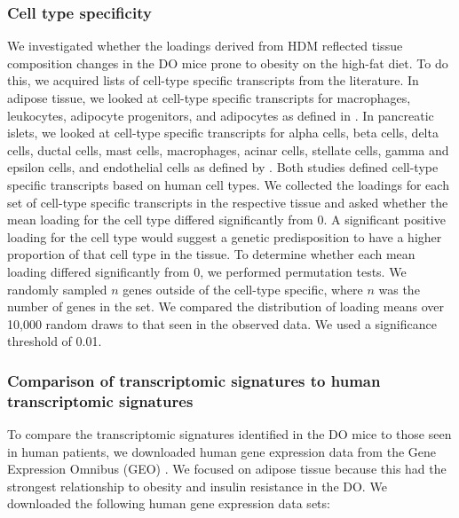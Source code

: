 \documentclass[
]{article}
\begin{document}
\subsubsection{Cell type specificity}\label{cell-type-specificity}

We investigated whether the loadings derived from HDM reflected tissue
composition changes in the DO mice prone to obesity on the high-fat
diet. To do this, we acquired lists of cell-type specific transcripts
from the literature. In adipose tissue, we looked at cell-type specific
transcripts for macrophages, leukocytes, adipocyte progenitors, and
adipocytes as defined in \cite{pmid29087381}. In pancreatic islets, we
looked at cell-type specific transcripts for alpha cells, beta cells,
delta cells, ductal cells, mast cells, macrophages, acinar cells,
stellate cells, gamma and epsilon cells, and endothelial cells as
defined by \cite{pmid36778506}. Both studies defined cell-type specific
transcripts based on human cell types. We collected the loadings for
each set of cell-type specific transcripts in the respective tissue and
asked whether the mean loading for the cell type differed significantly
from 0. A significant positive loading for the cell type would suggest a
genetic predisposition to have a higher proportion of that cell type in
the tissue. To determine whether each mean loading differed
significantly from 0, we performed permutation tests. We randomly
sampled \(n\) genes outside of the cell-type specific, where \(n\) was
the number of genes in the set. We compared the distribution of loading
means over 10,000 random draws to that seen in the observed data. We
used a significance threshold of 0.01.

\subsubsection{Comparison of transcriptomic signatures to human
transcriptomic
signatures}\label{comparison-of-transcriptomic-signatures-to-human-transcriptomic-signatures}

To compare the transcriptomic signatures identified in the DO mice to
those seen in human patients, we downloaded human gene expression data
from the Gene Expression Omnibus (GEO)
\cite{pmid37933855, pmid11752295}. We focused on adipose tissue because
this had the strongest relationship to obesity and insulin resistance in
the DO. We downloaded the following human gene expression data sets:
\end{document}
